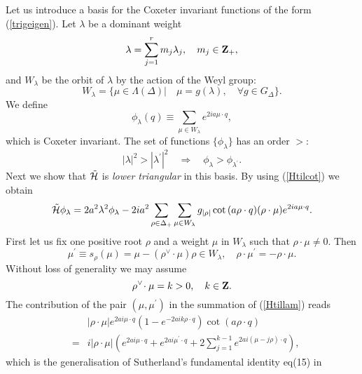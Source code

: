 \documentclass[a4paper,12pt]{article}
\begin{document}
Let us introduce a basis for the Coxeter invariant
functions of the form (\ref{trigeigen}). Let \(\lambda\) be a
dominant weight
\begin{equation}
   \lambda=\sum_{j=1}^rm_j\lambda_j,\quad m_j\in{\bf Z}_+,
\end{equation}
and \(W_{\lambda}\) be the orbit of \(\lambda\)
by the action of the Weyl group:
\begin{equation}
   W_{\lambda}=\{\mu\in\Lambda(\Delta)|\quad \mu=g(\lambda),\quad
   \forall g\in G_{\Delta}\}.
\end{equation}
We define
\begin{equation}
   \phi_{\lambda}(q)\equiv\sum_{\mu\in W_{\lambda}}e^{2ia\mu\cdot q},
\end{equation}
which is Coxeter invariant. The set of functions
\(\{\phi_{\lambda}\}\)  has an order
\(>\):
\begin{equation}
   |\lambda|^2>|\lambda^\prime|^2\quad
   \Rightarrow\quad \phi_{\lambda}>\phi_{\lambda^\prime}.
\end{equation}
Next we show that \(\tilde{\cal H}\) is {\em lower triangular\/}
in this basis. By using (\ref{Htilcot}) we obtain
\begin{equation}
   \tilde{\cal H}\phi_{\lambda}=2a^2\lambda^2\phi_{\lambda}
   -2ia^2\sum_{\rho\in\Delta_+}\sum_{\mu\in
   W_{\lambda}}{g_{|\rho|}\cot{(a\rho\cdot q)}}
   (\rho\cdot\mu) e^{2ia\mu\cdot q}.
   \label{Htillam}
\end{equation}
First let us fix one positive root \(\rho\) and a weight \(\mu\)
in \(W_{\lambda}\)
such that \(\rho\cdot\mu\neq0\).
Then
\begin{equation}
   \mu^\prime\equiv s_{\rho}(\mu)=\mu-(\rho^\vee\!\cdot\mu)\rho\in
W_{\lambda},
   \quad \rho\cdot\mu^\prime=-\rho\cdot\mu.
\end{equation}
Without loss of generality we may assume
\begin{equation}
   \rho^\vee\!\cdot\mu=k>0,\quad k\in{\bf Z}.
\end{equation}
The contribution of the pair \((\mu,\mu^\prime)\) in the summation of
(\ref{Htillam}) reads
\begin{eqnarray}
   &&|\rho\cdot\mu|e^{2ai\mu\cdot q}(1-e^{-2aik\rho\cdot
   q})\cot(a\rho\cdot q)\nonumber\\
   &=&i|\rho\cdot\mu|\left(e^{2ai\mu\cdot q}+e^{2ai\mu^\prime\cdot q}
   +2\sum_{j=1}^{k-1}e^{2ai(\mu-j\rho)\cdot q}\right),
\end{eqnarray}
which is the generalisation of Sutherland's fundamental
identity eq(15) in \cite{Sut}
\end{document}

